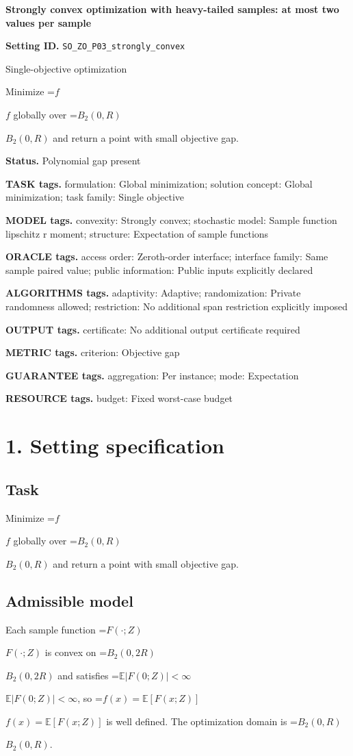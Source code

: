 \documentclass[10pt,a4paper]{article}
\newcommand{\AtlasMath}[1]{\par\begingroup\centering\setbox0=\hbox{$\displaystyle #1$}\ifdim\wd0>1.4\linewidth\typeout{ATLAS WIDE FORMULA: \the\wd0}\fi\ifdim\wd0>\linewidth\resizebox{\linewidth}{!}{\box0}\else\box0\fi\par\endgroup}
\newcommand{\AtlasInlineMath}[1]{\begingroup\setbox0=\hbox{$#1$}\ifdim\wd0>.4\linewidth\endgroup\AtlasMath{#1}\else\endgroup$#1$\fi}
\begin{document}
\raggedright

{\LARGE\bfseries\sffamily\color{AtlasNavy} Strongly convex optimization with heavy-tailed samples: at most two values per sample\par}\vspace{5pt}
\textbf{Setting ID.} \texttt{SO\_\allowbreak{}ZO\_\allowbreak{}P03\_\allowbreak{}strongly\_\allowbreak{}convex}

Single-objective optimization

Minimize \AtlasInlineMath{f} globally over \AtlasInlineMath{B_2(0,R)} and return a point with small objective gap.

\textbf{Status.} Polynomial gap present

\textbf{TASK tags.} formulation: Global minimization; solution concept: Global minimization; task family: Single objective

\textbf{MODEL tags.} convexity: Strongly convex; stochastic model: Sample function lipschitz r moment; structure: Expectation of sample functions

\textbf{ORACLE tags.} access order: Zeroth-order interface; interface family: Same sample paired value; public information: Public inputs explicitly declared

\textbf{ALGORITHMS tags.} adaptivity: Adaptive; randomization: Private randomness allowed; restriction: No additional span restriction explicitly imposed

\textbf{OUTPUT tags.} certificate: No additional output certificate required

\textbf{METRIC tags.} criterion: Objective gap

\textbf{GUARANTEE tags.} aggregation: Per instance; mode: Expectation

\textbf{RESOURCE tags.} budget: Fixed worst-case budget

\section{1. Setting specification}
\subsection{Task}
Minimize \AtlasInlineMath{f} globally over \AtlasInlineMath{B_2(0,R)} and return a point with small objective gap.

\subsection{Admissible model}
Each sample function \AtlasInlineMath{F(\cdot;Z)} is convex on \AtlasInlineMath{B_2(0,2R)} and satisfies \AtlasInlineMath{\mathbb{E}|F(0;Z)|<\infty}, so \AtlasInlineMath{f(x)=\mathbb{E}[F(x;Z)]} is well defined. The optimization domain is \AtlasInlineMath{B_2(0,R)}.
\end{document}
